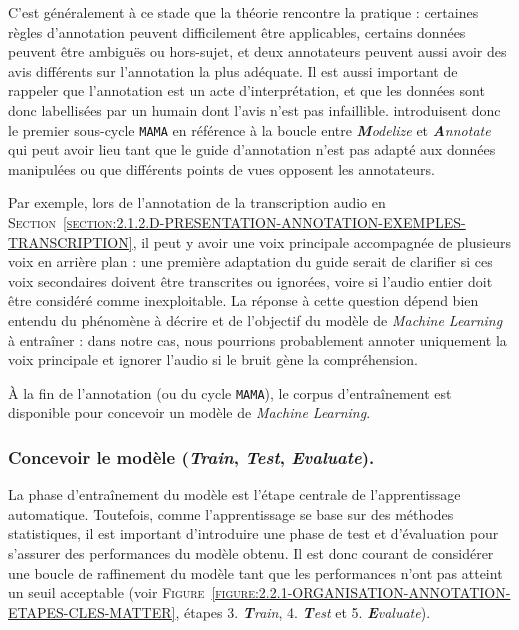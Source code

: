 			\begin{leftBarInformation}
				C'est généralement à ce stade que la théorie rencontre la pratique : certaines règles d'annotation peuvent difficilement être applicables, certains données peuvent être ambiguës ou hors-sujet, et deux annotateurs peuvent aussi avoir des avis différents sur l'annotation la plus adéquate.
				Il est aussi important de rappeler que l’annotation est un acte d'interprétation, et que les données sont donc labellisées par un humain dont l'avis n'est pas infaillible. 
				\cite{pustejovsky-stubbs:2012:natural-language-annotation} introduisent donc le premier sous-cycle \texttt{MAMA} en référence à la boucle entre \textit{\textbf{M}odelize} et \textit{\textbf{A}nnotate} qui peut avoir lieu tant que le guide d'annotation n'est pas adapté aux données manipulées ou que différents points de vues opposent les annotateurs.
				
				Par exemple, lors de l'annotation de la transcription audio en \textsc{Section~\ref{section:2.1.2.D-PRESENTATION-ANNOTATION-EXEMPLES-TRANSCRIPTION}}, il peut y avoir une voix principale accompagnée de plusieurs voix en arrière plan : une première adaptation du guide serait de clarifier si ces voix secondaires doivent être transcrites ou ignorées, voire si l'audio entier doit être considéré comme inexploitable.
				La réponse à cette question dépend bien entendu du phénomène à décrire et de l'objectif du modèle de \textit{Machine Learning} à entraîner : dans notre cas, nous pourrions probablement annoter uniquement la voix principale et ignorer l'audio si le bruit gène la compréhension.
			\end{leftBarInformation}
			
			À la fin de l'annotation (ou du cycle \texttt{MAMA}), le corpus d'entraînement est disponible pour concevoir un modèle de \textit{Machine Learning}.
			
		
		\subsubsection{Concevoir le modèle (\textit{\textbf{T}rain}, \textit{\textbf{T}est}, \textit{\textbf{E}valuate}).}
		\label{section:2.2.1.B-ORGANISATION-ANNOTATION-ETAPES-CLES-TRAIN-TEST}
			
			La phase d'entraînement du modèle est l'étape centrale de l'apprentissage automatique.
			Toutefois, comme l'apprentissage se base sur des méthodes statistiques, il est important d'introduire une phase de test et d'évaluation pour s'assurer des performances du modèle obtenu.
			Il est donc courant de considérer une boucle de raffinement du modèle tant que les performances n'ont pas atteint un seuil acceptable (voir \textsc{Figure~\ref{figure:2.2.1-ORGANISATION-ANNOTATION-ETAPES-CLES-MATTER}}, étapes 3. \textit{\textbf{T}rain}, 4. \textit{\textbf{T}est} et 5. \textit{\textbf{E}valuate}).
			
